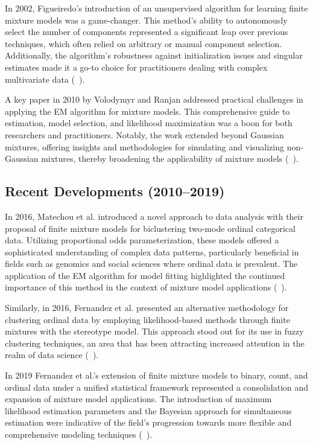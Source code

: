 \documentclass{article}
\begin{document}
In 2002, Figueiredo's introduction of an unsupervised algorithm for learning finite mixture models was a game-changer. This method's ability to autonomously select the number of components represented a significant leap over previous techniques, which often relied on arbitrary or manual component selection. Additionally, the algorithm's robustness against initialization issues and singular estimates made it a go-to choice for practitioners dealing with complex multivariate data (~\cite{figueiredo2002unsupervised}).

A key paper in 2010 by Volodymyr and Ranjan addressed practical challenges in applying the EM algorithm for mixture models. This comprehensive guide to estimation, model selection, and likelihood maximization was a boon for both researchers and practitioners. Notably, the work extended beyond Gaussian mixtures, offering insights and methodologies for simulating and visualizing non-Gaussian mixtures, thereby broadening the applicability of mixture models (~\cite{10.1214/09-SS053}).

\subsection*{Recent Developments (2010--2019)}

In 2016, Matechou et al. introduced a novel approach to data analysis with their proposal of finite mixture models for biclustering two-mode ordinal categorical data. Utilizing proportional odds parameterization, these models offered a sophisticated understanding of complex data patterns, particularly beneficial in fields such as genomics and social sciences where ordinal data is prevalent. The application of the EM algorithm for model fitting highlighted the continued importance of this method in the context of mixture model applications (~\cite{matechou2016biclustering}).

Similarly, in 2016, Fernandez et al. presented an alternative methodology for clustering ordinal data by employing likelihood-based methods through finite mixtures with the stereotype model. This approach stood out for its use in fuzzy clustering techniques, an area that has been attracting increased attention in the realm of data science (~\cite{fernandez2016mixture}).

In 2019 Fernandez et al.'s extension of finite mixture models to binary, count, and ordinal data under a unified statistical framework represented a consolidation and expansion of mixture model applications. The introduction of maximum likelihood estimation parameters and the Bayesian approach for simultaneous estimation were indicative of the field's progression towards more flexible and comprehensive modeling techniques (~\cite{fernandez2019finite}).
\end{document}

